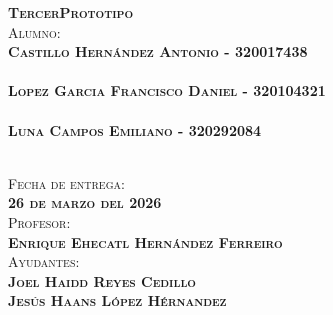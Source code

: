 \begin{titlepage}
\begin{minipage}[c][0.81\textheight][t]{0.75\textwidth}
\begin{center}
			\textsc{\Large \textbf{T}\hspace{0.3cm}\textbf{e}\hspace{0.3cm}\textbf{r}\hspace{0.3cm}\textbf{c}\hspace{0.3cm}\textbf{e}\hspace{0.3cm}\textbf{r}\hspace{0.5cm}\textbf{P}\hspace{0.3cm}\textbf{r}\hspace{0.3cm}\textbf{o}\hspace{0.3cm}\textbf{t}\hspace{0.3cm}\textbf{o}\hspace{0.3cm}\textbf{t}\hspace{0.3cm}\textbf{i}\hspace{0.3cm}\textbf{p}\hspace{0.3cm}\textbf{o}}\\ [2cm]

            
			\textsc{\Large{Alumno:  }\normalsize \\
                \vspace{.3cm}
				\textbf{ 
                \vspace{.2cm}
				Castillo Hernández Antonio - 320017438 \\
				\phone\phone\phone\\
				Lopez Garcia Francisco Daniel - 320104321\\
				\phone\phone\phone\\
				Luna Campos Emiliano - 320292084\\
				\phone\phone\phone\\
                \vspace{1cm}
                  }}    
			
			\textsc{{Fecha de entrega: \\ \textbf{26 de marzo del 2026}}}\\[1.2cm]        
			
			\textsc{{Profesor: \\ \textbf{Enrique Ehecatl Hernández Ferreiro}}}\\[1.2cm]  
			
			\textsc{Ayudantes: \\ \textbf{Joel Haidd Reyes Cedillo \\ Jesús Haans López Hérnandez } }
			
			
			\vspace{0.5cm}
		\end{center}
	\end{minipage}
\end{titlepage}

